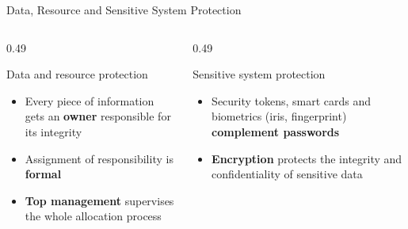 \documentclass[aspectratio=169,11pt,xcolor={table}]{beamer}
\begin{document}
\begin{frame}{Data, Resource and Sensitive System Protection}
  \begin{columns}[T]
    \begin{column}{0.49\textwidth}
      \begin{block}{Data and resource protection}
        \small
        \begin{itemize}\setlength{\itemsep}{2pt}
          \item Every piece of information gets an \textbf{owner} responsible for its integrity
          \item Assignment of responsibility is \textbf{formal}
          \item \textbf{Top management} supervises the whole allocation process
        \end{itemize}
      \end{block}
      \centering
    \end{column}
    \begin{column}{0.49\textwidth}
      \begin{alertblock}{Sensitive system protection}
        \small
        \begin{itemize}\setlength{\itemsep}{2pt}
          \item Security tokens, smart cards and biometrics (iris, fingerprint) \textbf{complement passwords}
          \item \textbf{Encryption} protects the integrity and confidentiality of sensitive data
        \end{itemize}
      \end{alertblock}
      \centering
    \end{column}
  \end{columns}
\end{frame}
\end{document}
